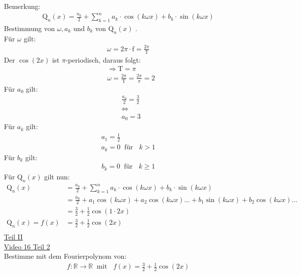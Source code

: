 Bemerkung:\\
\begin{align*}
\mathrm{Q}_n(x)=\frac{a_0}{2}+\sum\limits_{k=1}^{n}a_k\cdot\cos(k\omega x)+b_k\cdot\sin(k\omega x)
\end{align*}
Bestimmung von $ \omega, a_k $ und $ b_k $ von $\mathrm{Q}_n(x)$ .\\
Für $ \omega $ gilt:\\
\begin{align*}
\omega =2\pi\cdot \mathrm{f}=\frac{2\pi}{\mathrm{T}}
\end{align*}
Der $ \cos(2x) $ ist $ \pi $-periodisch, daraus folgt:\\
\begin{align*}
&\Rightarrow \mathrm{T}=\pi\\
&\omega=\frac{2\pi}{\mathrm{T}}=\frac{2\pi}{\pi}=2
\end{align*}
Für $ a_0 $ gilt:\\
\begin{align*}
&\frac{a_0}{2}=\frac{3}{2}\\
&\Leftrightarrow\\
&a_0=3
\end{align*}
Für $ a_k $ gilt:\\ 
\begin{align*}
a_1=\frac{1}{2}\\
a_k=0\;\;\text{für }\;\; k>1
\end{align*}
Für $ b_k $ gilt:\\ 
\begin{align*}
b_k=0\;\;\text{für }\;\;k\geq 1
\end{align*}
Für $\mathrm{Q}_n(x)  $ gilt nun:\\
\begin{align*}
\mathrm{Q}_n(x)&=\frac{a_0}{2}+\sum\limits_{k=1}^{n}a_k\cdot\cos(k\omega x)+b_k\cdot\sin(k\omega x)\\
&=\frac{a_0}{2}+a_1\cos(k\omega x)+a_2\cos(k\omega x)\dots+b_1\sin(k\omega x)+b_2\cos(k\omega x)\dots\\
&=\frac{3}{2}+\frac{1}{2}\cos(1\cdot 2x)\\
\mathrm{Q}_n(x)=f(x)&=\frac{3}{2}+\frac{1}{2}\cos( 2x)\\
\end{align*}
\underline{Teil II}\\
\href{https://youtu.be/j2W_UAccyW8}{Video 16 Teil 2}\\
Bestimme  mit dem Fourierpolynom von:\\
\begin{align*}
f:\mathbb{R}\rightarrow\mathbb{R} \;\;\text{mit  }\;\; f(x)=\frac{3}{2}+\frac{1}{2}\cos(2x)
\end{align*}

